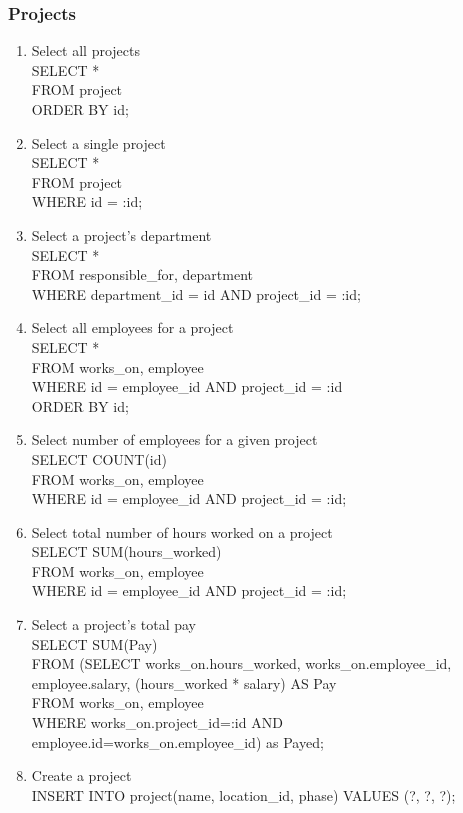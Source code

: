 \documentclass[fleqn, 11pt,letterpaper]{article}
\begin{document}
	\subsubsection{Projects}
	\begin{enumerate}
		\item Select all projects \\SELECT * \\FROM project \\ORDER BY id;
		\item Select a single project \\SELECT * \\FROM project \\WHERE id = :id;
		\item Select a project's department \\SELECT * \\FROM responsible\_for, department \\WHERE department\_id = id AND project\_id = :id;
		\item Select all employees for a project \\SELECT * \\FROM works\_on, employee \\WHERE id = employee\_id AND project\_id = :id \\ORDER BY id;
		\item Select number of employees for a given project \\SELECT COUNT(id) \\FROM works\_on, employee \\WHERE id = employee\_id AND project\_id = :id;
		\item Select total number of hours worked on a project \\SELECT SUM(hours\_worked) \\FROM works\_on, employee \\WHERE id = employee\_id AND project\_id = :id;
		\item Select a project's total pay \\SELECT SUM(Pay) \\FROM (SELECT works\_on.hours\_worked, works\_on.employee\_id, employee.salary, (hours\_worked * salary) AS Pay \\FROM works\_on, employee \\WHERE  works\_on.project\_id=:id AND employee.id=works\_on.employee\_id) as Payed; 
		\item Create a project \\INSERT INTO project(name, location\_id, phase) VALUES (?, ?, ?);

\end{enumerate}
\end{document}
